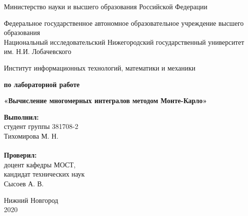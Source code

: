 \documentclass{report}
\begin{document}
\begin{titlepage}

\begin{center}
Министерство науки и высшего образования Российской Федерации
\end{center}

\begin{center}
Федеральное государственное автономное образовательное учреждение высшего образования \\
Национальный исследовательский Нижегородский государственный университет им. Н.И. Лобачевского
\end{center}

\begin{center}
Институт информационных технологий, математики и механики
\end{center}

\vspace{4em}

\begin{center}
\textbf{ по лабораторной работе} \\
\end{center}
\begin{center}
\textbf{\Large«Вычисление многомерных интегралов методом Монте-Карло»} \\
\end{center}

\vspace{4em}

\newbox{\lbox}
\newlength{\maxl}
\setlength{\maxl}{\wd\lbox}
\hfill\parbox{7cm}{
\hspace*{5cm}\hspace*{-5cm}\textbf{Выполнил:} \\ студент группы 381708-2 \\ Тихомирова М. Н.\\
\\
\hspace*{5cm}\hspace*{-5cm}\textbf{Проверил:}\\ доцент кафедры МОСТ, \\ кандидат технических наук \\ Сысоев А. В.
}

\vspace{\fill}

\begin{center} Нижний Новгород \\ 2020 \end{center}

\end{titlepage}
\end{document}
